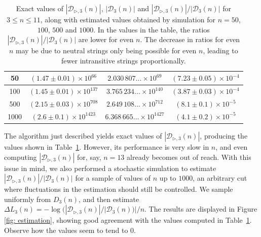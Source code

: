\documentclass[reqno,a4paper,11pt]{amsart}
\newcommand{\btt}{\triangleright}
\theoremstyle{remark}
\newcommand{\mc}[1]{{\mathcal #1}}
\numberwithin{equation}{section}
\begin{document}
\begin{table}[ht]
\begin{tabular}{|c|c|c|c|}
                    \\\hline\hline
                    50                  & $(1.47\pm0.01)\times 10^{66}$            & $2.030\,807\ldots\times 10^{69}$                    & $(7.23\pm 0.05)\times 10^{-4}$              \\ \hline
                    100                  & $(1.45\pm0.01)\times 10^{137}$            & $3.765\,234\ldots \times 10^{140}$                    & $(3.87\pm 0.03)\times 10^{-4}$              \\ \hline
                    500                  & $(2.15\pm0.03)\times 10^{708}$            & $2.649\,108\ldots \times 10^{712}$                    & $(8.1\pm 0.1)\times 10^{-5}$              \\ \hline
                    1000                  & $(2.6\pm0.1)\times 10^{1423}$            & $6.368\,665\ldots \times 10^{1427}$                    & $(4.1\pm 0.2)\times 10^{-5}$              \\ \hline
                \end{tabular}
                \vspace{1cm}
                \caption{Exact values of $|\mc D_{\btt, 3}(n)|$, $|\mc D_3(n)|$ and $|\mc D_{\btt, 3}(n)|/|\mc D_3(n)|$ for $3\le n\le 11$, along with estimated values obtained by simulation for $n=50$, $100$, $500$ and $1000$. In the values in the table, the ratios $|\mc D_{\btt, 3}(n)|/|\mc D_3(n)|$ are lower for even $n$. The decrease in ratios for even $n$ may be due to neutral strings only being possible for even $n$, leading to fewer intransitive strings proportionally.
                }\label{tab: In computado}
            \end{table}
            \renewcommand{\arraystretch}{1}

The algorithm just described yields exact values of $|\mc D_{\btt, 3}(n)|$, producing the values shown in Table~\ref{tab: In computado}. However, its performance is very slow in $n$, and even computing $|\mc D_{\btt, 3}(n)|$ for, say, $n=13$ already becomes out of reach. With this issue in mind, we also performed a stochastic simulation to estimate $|\mc D_{\btt, 3}(n)|/|\mc D_3(n)|$ for a sample of values of $n$ up to $1000$, an arbitrary cut where fluctuations in the estimation should still be controlled. We sample uniformly from $D_3(n)$, and then estimate $\Delta L_3(n)=-\log(|\mathcal{D}_{\btt, 3}(n)|/|\mathcal{D}_{3}(n))|/n$. The results are displayed in Figure \ref{fig: estimation}, showing good agreement with the values computed in Table~\ref{tab: In computado}. 
Observe how the values seem to tend to $0$. 
\end{document}
